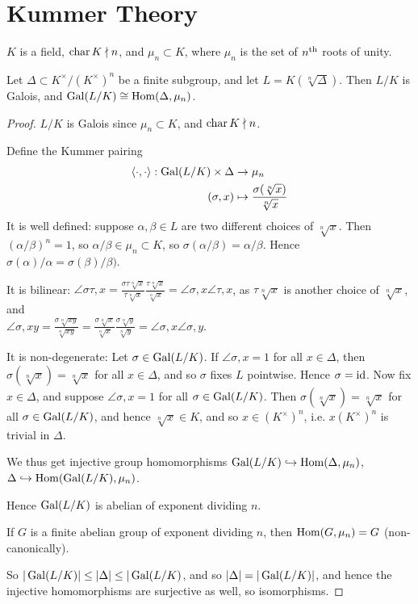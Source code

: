 \documentclass[10pt,a4paper]{article}
\begin{document}
\section{Kummer Theory}
$K$ is a field, $\operatorname{char} K \nmid n$, and $\mu_n \subset K$, where $\mu_n$ is the set of $n\textsuperscript{th}$ roots of unity.
\begin{lemma}
  Let $\Delta \subset K^\times/(K^\times)^n$ be a finite subgroup, and let $L = K(\sqrt[n]{\Delta})$. Then $L/K$ is Galois, and $\operatorname{Gal}(L/K) \cong \operatorname{Hom}(\Delta, \mu_n)$.
\end{lemma}
\begin{proof}
  $L/K$ is Galois since $\mu_n \subset K$, and $\operatorname{char} K \nmid n$.

  Define the Kummer pairing
  \begin{align*}
    \langle \cdot, \cdot \rangle : \operatorname{Gal}(L/K)\times \Delta &\to \mu_n\\
    (\sigma, x) &\mapsto \frac{\sigma(\sqrt[n]{x})}{\sqrt[n]{x}}
  \end{align*}
  It is well defined: suppose $\alpha, \beta \in L$ are two different choices of $\sqrt[n]{x}$. Then $(\alpha/\beta)^n = 1$, so $\alpha/\beta \in \mu_n \subset K$, so $\sigma(\alpha/\beta) = \alpha/\beta$. Hence $\sigma(\alpha)/\alpha = \sigma(\beta)/\beta)$.

  It is bilinear: $\angle{\sigma\tau, x} = \frac{\sigma\tau\sqrt[n]{x}}{\tau\sqrt[n]{x}}\frac{\tau\sqrt[n]{x}}{\sqrt[n]{x}} = \angle{\sigma, x}\angle{\tau, x}$, as $\tau \sqrt[n]{x}$ is another choice of $\sqrt[n]{x}$, and\\
  $\angle{\sigma, xy} = \frac{\sigma\sqrt[n]{xy}}{\sqrt[n]{xy}} = \frac{\sigma\sqrt[n]{x}}{\sqrt[n]{x}}\frac{\sigma\sqrt[n]{y}}{\sqrt[n]{y}} = \angle{\sigma, x}\angle{\sigma, y}$.

  It is non-degenerate: Let $\sigma \in \operatorname{Gal}(L/K)$. If $\angle{\sigma, x} = 1$ for all $x \in \Delta$, then $\sigma(\sqrt[n]{x}) = \sqrt[n]{x}$ for all $x \in \Delta$, and so $\sigma$ fixes $L$ pointwise. Hence $\sigma = \operatorname{id}$. Now fix $x \in \Delta$, and suppose $\angle{\sigma, x} = 1$ for all $\sigma \in \operatorname{Gal}(L/K)$. Then $\sigma(\sqrt[n]{x}) = \sqrt[n]{x}$ for all $\sigma \in \operatorname{Gal}(L/K)$, and hence $\sqrt[n]{x} \in K$, and so $x \in (K^\times)^n$, i.e. $x (K^\times)^n$ is trivial in $\Delta$.

  We thus get injective group homomorphisms $\operatorname{Gal}(L/K) \hookrightarrow \operatorname{Hom}(\Delta, \mu_n)$, $\Delta \hookrightarrow  \operatorname{Hom}(\operatorname{Gal}(L/K), \mu_n)$.

  Hence $\operatorname{Gal}(L/K)$ is abelian of exponent dividing $n$.

  If $G$ is a finite abelian group of exponent dividing $n$, then $\operatorname{Hom}(G, \mu_n) = G$ (non-canonically).

  So $|\operatorname{Gal}(L/K)| \leq |\Delta|\leq |\operatorname{Gal}(L/K)$, and so $|\Delta| = |\operatorname{Gal}(L/K)|$, and hence the injective homomorphisms are surjective as well, so isomorphisms.
\end{proof}
\end{document}
